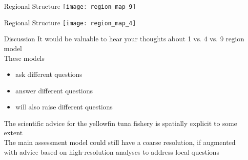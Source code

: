 \documentclass[aspectratio=169]{beamer}
\begin{document}

\begin{frame}{Regional Structure}
  \vspace{1ex}
  \texttt{[image: region\_map\_9]}
\end{frame}


\begin{frame}{Regional Structure}
  \vspace{1ex}
  \texttt{[image: region\_map\_4]}
\end{frame}


\begin{frame}{Discussion}\small
  It would be valuable to hear your thoughts about 1 vs. 4 vs. 9 region
  model\\[4ex]

  These models
  \begin{itemize}
    \item ask different questions\\[-1ex]
    \item answer different questions\\[-1ex]
    \item will also raise different questions
  \end{itemize}
  \vspace{2ex}

  The scientific advice for the yellowfin tuna fishery is spatially explicit to
  some extent\\[4ex]

  The main assessment model could still have a coarse resolution, if augmented\\
  with advice based on high-resolution analyses to address local questions
  \vspace{4ex}
\end{frame}
\end{document}
